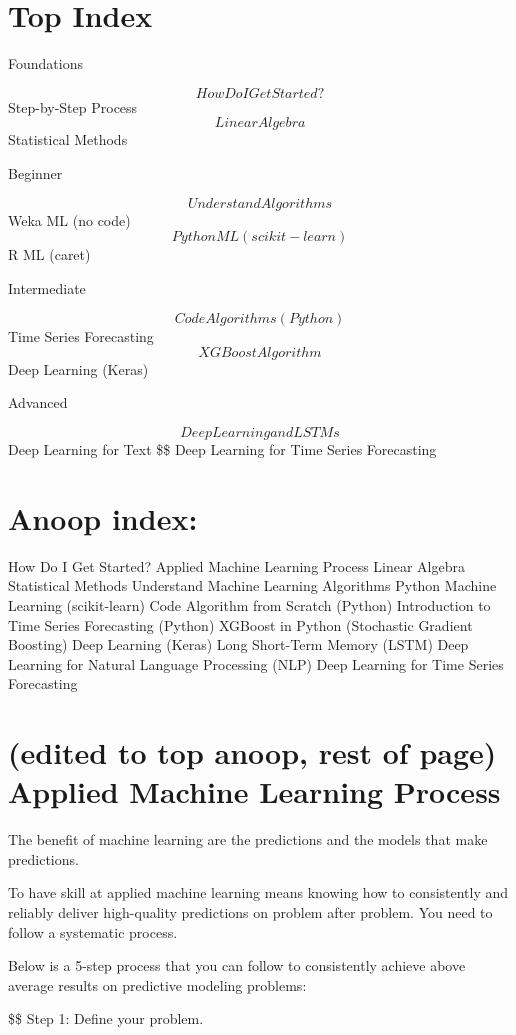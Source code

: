 \documentclass[11pt]{article}
\author{Anoop G R}
\date{\today}
\title{}
\begin{document}
\tableofcontents

\section{Top Index}
\label{sec:orge92e371}

Foundations

$$ How Do I Get Started?
$$ Step-by-Step Process
$$ Linear Algebra
$$ Statistical Methods

Beginner

$$ Understand Algorithms
$$ Weka ML (no code)
$$ Python ML (scikit-learn)
$$ R ML (caret)

Intermediate

$$ Code Algorithms (Python)
$$ Time Series Forecasting
$$ XGBoost Algorithm
$$ Deep Learning (Keras)

Advanced

$$ Deep Learning and LSTMs
$$ Deep Learning for Text
\$\$ Deep Learning for Time Series Forecasting


\section{Anoop index:}
\label{sec:org7cb2e88}
How Do I Get Started?
Applied Machine Learning Process
Linear Algebra
Statistical Methods
Understand Machine Learning Algorithms
Python Machine Learning (scikit-learn)
Code Algorithm from Scratch (Python)
Introduction to Time Series Forecasting (Python)
XGBoost in Python (Stochastic Gradient Boosting)
Deep Learning (Keras)
Long Short-Term Memory (LSTM)
Deep Learning for Natural Language Processing (NLP)
Deep Learning for Time Series Forecasting

\section{(edited to top anoop, rest of page) Applied Machine Learning Process}
\label{sec:orgfcd3a32}

The benefit of machine learning are the predictions and the models that make predictions.

To have skill at applied machine learning means knowing how to consistently and reliably deliver high-quality predictions on problem after problem. You need to follow a systematic process.

Below is a 5-step process that you can follow to consistently achieve above average results on predictive modeling problems:

\$\$ Step 1: Define your problem. 
\end{document}
